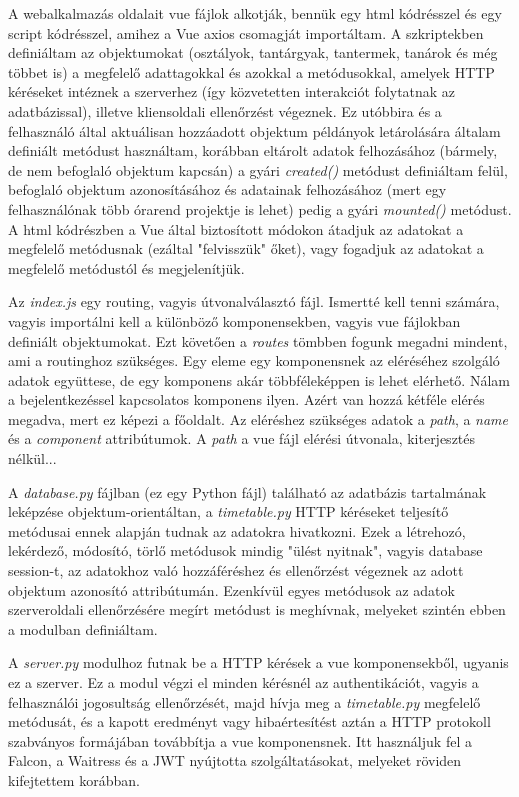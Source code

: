 \documentclass[12pt,a4paper]{report}
\begin{document}
A webalkalmazás oldalait vue fájlok alkotják, bennük egy html kódrésszel és egy script kódrésszel, amihez a Vue axios csomagját importáltam. A szkriptekben definiáltam az objektumokat (osztályok, tantárgyak, tantermek, tanárok és még többet is) a megfelelő adattagokkal és azokkal a metódusokkal, amelyek HTTP kéréseket intéznek a szerverhez (így közvetetten interakciót folytatnak az adatbázissal), illetve kliensoldali ellenőrzést végeznek. Ez utóbbira és a felhasználó által aktuálisan hozzáadott objektum példányok letárolására általam definiált metódust használtam, korábban eltárolt adatok felhozásához (bármely, de nem befoglaló objektum kapcsán) a gyári \textsl{created()} metódust definiáltam felül, befoglaló objektum azonosításához és adatainak felhozásához (mert egy felhasználónak több órarend projektje is lehet) pedig a gyári \textsl{mounted()} metódust. A html kódrészben a Vue által biztosított módokon átadjuk az adatokat a megfelelő metódusnak (ezáltal "felvisszük" őket), vagy fogadjuk az adatokat a megfelelő metódustól és megjelenítjük.

Az \textsl{index.js} egy routing, vagyis útvonalválasztó fájl. Ismertté kell tenni számára, vagyis importálni kell a különböző komponensekben, vagyis vue fájlokban definiált objektumokat. Ezt követően a \textsl{routes} tömbben fogunk megadni mindent, ami a routinghoz szükséges. Egy eleme egy komponensnek az eléréséhez szolgáló adatok együttese, de egy komponens akár többféleképpen is lehet elérhető. Nálam a bejelentkezéssel kapcsolatos komponens ilyen. Azért van hozzá kétféle elérés megadva, mert ez képezi a főoldalt. Az eléréshez szükséges adatok a \textsl{path}, a \textsl{name} és a \textsl{component} attribútumok. A \textsl{path} a vue fájl elérési útvonala, kiterjesztés nélkül...

A \textsl{database.py} fájlban (ez egy Python fájl) található az adatbázis tartalmának leképzése objektum-orientáltan, a \textsl{timetable.py} HTTP kéréseket teljesítő metódusai ennek alapján tudnak az adatokra hivatkozni. Ezek a létrehozó, lekérdező, módosító, törlő metódusok mindig "ülést nyitnak", vagyis database session-t, az adatokhoz való hozzáféréshez és ellenőrzést végeznek az adott objektum azonosító attribútumán. Ezenkívül egyes metódusok az adatok szerveroldali ellenőrzésére megírt metódust is meghívnak, melyeket szintén ebben a modulban definiáltam.

A \textsl{server.py} modulhoz futnak be a HTTP kérések a vue komponensekből, ugyanis ez a szerver. Ez a modul végzi el minden kérésnél az authentikációt, vagyis a felhasználói jogosultság ellenőrzését, majd hívja meg a \textsl{timetable.py} megfelelő metódusát, és a kapott eredményt vagy hibaértesítést aztán a HTTP protokoll szabványos formájában továbbítja a vue komponensnek. Itt használjuk fel a Falcon, a Waitress és a JWT nyújtotta szolgáltatásokat, melyeket röviden kifejtettem korábban.
\end{document}
